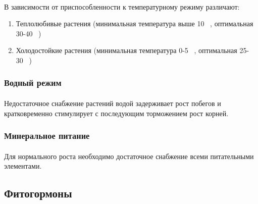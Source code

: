 \paragraph*{}В зависимости от приспособленности к температурному режиму различают:

\begin{enumerate}
	\item Теплолюбивые растения (минимальная температура выше 10~ \celsius, оптимальная 30-40~ \celsius)
	\item Холодостойкие растения (минимальная температура 0-5~ \celsius, оптимальная 25-30~ \celsius)
\end{enumerate}



\subsubsection*{Водный режим}
\paragraph*{}Недостаточное снабжение растений водой задерживает рост побегов и кратковременно стимулирует с последующим торможением рост корней. 

\subsubsection*{Минеральное питание}
\paragraph*{}Для нормального роста необходимо достаточное снабжение всеми питательными элементами. 

\subsection*{Фитогормоны} 

